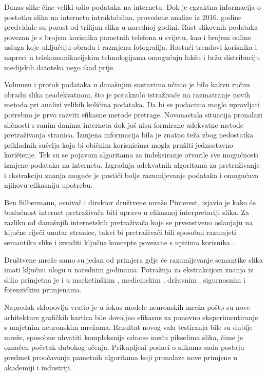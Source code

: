 \documentclass[times, utf8, proizvoljni, numeric]{fer}
\begin{document}
Danas slike čine veliki udio podataka na internetu. Dok je egzaktna informacija o postotku slika na internetu intraktabilna, provedene analize iz 2016. godine \cite{img-analysis} predviđale su porast od trilijun slika u narednoj godini. Rast slikovnih podataka povezan je s brojem korisnika pametnih telefona u svijetu, kao i brojem online usluga koje uključuju obradu i razmjenu fotografija. Rastući trendovi korisnika \cite{net-users} i napreci u telekomunikacijskim tehnologijama omogućuju lakšu i bržu distribuciju medijskih datoteka nego ikad prije. 

Volumen i protok podataka u današnjim sustavima učinio je bilo kakvu ručnu obradu slika neadekvatnom, što je potaknulo istraživače na razmatranje novih metoda pri analizi velikih količina podataka. Da bi se podacima moglo upravljati potrebno je prvo razviti efikasne metode pretrage. Novonastala situacija pronalazi sličnosti s ranim danima interneta dok još nisu formirane adekvatne metode pretraživanja stranica. Izmjena informacija bila je znatno teža zbog nedostatka prikladnih sučelja koja bi običnim korisnicima mogla pružiti jednostavno korištenje. Tek su se pojavom algoritama za indeksiranje otvorile sve mogućnosti izmjene podataka na internetu. Izgradnja adekvatnih algoritama za pretraživanje i ekstrakciju znanja moguće je postići bolje razumijevanje podataka i omogućava njihovu efikasniju upotrebu. 

Ben Silbermann, osnivač i direktor društvene mreže Pinterest, izjavio je kako će budućnost internet pretraživača biti upravo u efikasnoj interpretaciji slika. Za razliku od današnjih internetskih pretraživača koje se prvenstveno oslanjaju na ključne riječi unutar stranice, takvi bi pretraživači bili sposobni razumjeti semantiku slike i izvaditi ključne koncepte povezane s upitima korisnika \cite{internet-trends}.

Društvene mreže samo su jedan od primjera gdje će razumijevanje semantike slika imati ključnu ulogu u narednim godinama. Potražnja za ekstrakcijom znanja iz slika primjetna je i u marketinškim \cite{electronic-commerce-application}, medicinskim \cite{medical-application} \cite{medical-diagnostics-application}, državnim \cite{smart-city-application}, sigurnosnim \cite{security-application} i forenzičkim \cite{forensics-application} primjenama. 

Napredak sklopovlja vratio je u fokus modele neuronskih mreža pošto su nove arhitekture grafičkih kartica bile dovoljno efikasne za ponovno eksperimentiranje s umjetnim neuronskim mrežama. Rezultat novog vala testiranja bile su dublje mreže, sposobne uhvatiti kompleksnije odnose među pikselima slika, čime je označen početak dubokog učenja. Prikupljeni podaci o slikama sada postaju predmet proučavanja pametnih algoritama koji pronalaze nove primjene u akademiji i industriji. 
\end{document}
